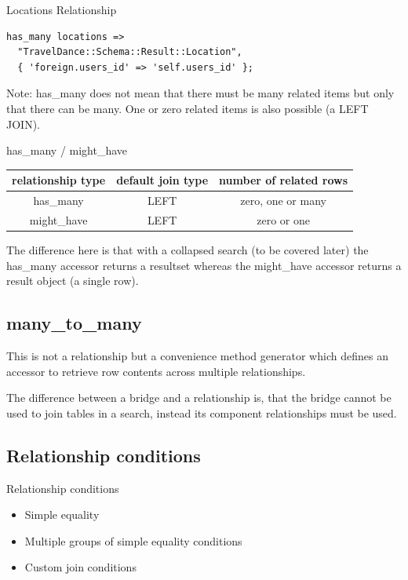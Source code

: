 \begin{frame}[fragile]{Locations Relationship}
\begin{lstlisting}
has_many locations =>
  "TravelDance::Schema::Result::Location",
  { 'foreign.users_id' => 'self.users_id' };
\end{lstlisting}
\end{frame}

Note: has\_many does not mean that there must be many related items but only that there can be many. One or zero related items is also possible (a LEFT JOIN).


\begin{frame}{has\_many / might\_have}
\begin{table}
\begin{tabular}{c | c | c}
relationship type & default join type & number of related rows \\
\hline
has\_many & LEFT & zero, one or many \\
might\_have & LEFT & zero or one \\
\end{tabular}
\end{table}
\end{frame}

The difference here is that with a collapsed search (to be covered later)
the has\_many accessor returns a resultset whereas the might\_have accessor
returns a result object (a single row).

\subsection{many\_to\_many}

This is not a relationship but a convenience method generator which defines an
accessor to retrieve row contents across multiple relationships.

The difference between a bridge and a relationship is, that the bridge
cannot be used to join tables in a search, instead its component
relationships must be used.

\subsection{Relationship conditions}

\begin{frame}{Relationship conditions}
\begin{itemize}
\item Simple equality
\item Multiple groups of simple equality conditions
\item Custom join conditions
\end{itemize}
\end{frame}


